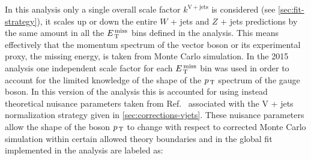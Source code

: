 In this analysis only a single overall scale factor $k^\mathrm{V + jets}$ is
considered (see \cref{sec:fit-strategy}), it scales up or down the entire $W$ +
jets and $Z$ + jets predictions by the same amount in all the $E_\mathrm{\, T}^\mathrm{\, miss}$ bins
defined in the analysis. This means effectively that the momentum spectrum of
the vector boson or its experimental proxy, the missing energy, is taken from
Monte Carlo simulation. In the 2015 analysis one independent scale factor for
each $E_\mathrm{\, T}^\mathrm{\, miss}$ bin was used in order to account for the limited knowledge of the
shape of the $p_\mathrm{\, T}$ spectrum of the gauge boson. In this version of the analysis
this is accounted for using instead theoretical nuisance parameters taken from
Ref.~\cite{VplusJetsCorrections} associated with the V + jets normalization
strategy given in \cref{sec:corrections-vjets}. These nuisance parameters allow
the shape of the boson $p_\mathrm{\, T}$ to change with respect to corrected Monte Carlo
simulation within certain allowed theory boundaries and in the global fit
implemented in the analysis are labeled as:
